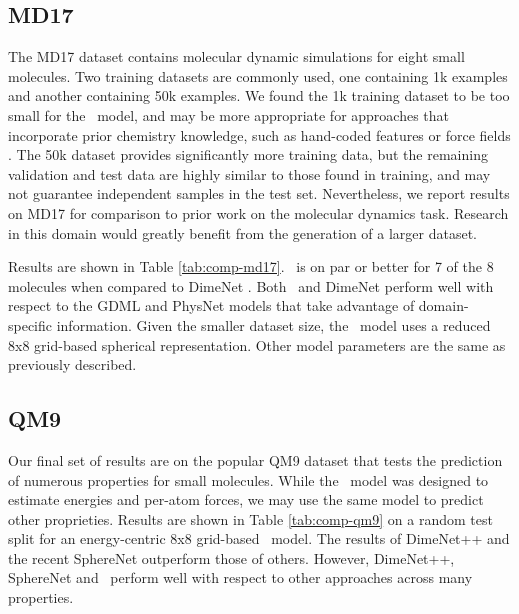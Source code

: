 \subsection{MD17}

The MD17 dataset \cite{chmiela2017machine,chmiela2018towards} contains molecular dynamic simulations for eight small molecules. Two training datasets are commonly used, one containing 1k examples and another containing 50k examples. We found the 1k training dataset to be too small for the \model~model, and may be more appropriate for approaches that incorporate prior chemistry knowledge, such as hand-coded features or force fields \cite{chmiela2017machine,unke2019physnet}. The 50k dataset provides significantly more training data, but the remaining validation and test data are highly similar to those found in training, and may not guarantee independent samples in the test set\cite{christensen2020role}. Nevertheless, we report results on MD17 for comparison to prior work on the molecular dynamics task. Research in this domain would greatly benefit from the generation of a larger dataset. 

Results are shown in Table \ref{tab:comp-md17}. \model~is on par or better for 7 of the 8 molecules when compared to DimeNet \cite{klicpera2020directional}. Both \model~and DimeNet perform well with respect to the GDML \cite{chmiela2017machine} and PhysNet \cite{unke2019physnet} models that take advantage of domain-specific information. Given the smaller dataset size, the \model~model uses a reduced 8x8 grid-based spherical representation. Other model parameters are the same as previously described.






\subsection{QM9}

Our final set of results are on the popular QM9 dataset \cite{ramakrishnan2014quantum} that tests the prediction of numerous properties for small molecules. While the \model~model was designed to estimate energies and per-atom forces, we may use the same model to predict other proprieties. Results are shown in Table \ref{tab:comp-qm9} on a random test split for an energy-centric 8x8 grid-based \model~model. The results of DimeNet++ and the recent SphereNet\cite{liu2021spherical} outperform those of others. However, DimeNet++, SphereNet and \model~perform well with respect to other approaches across many properties. 






